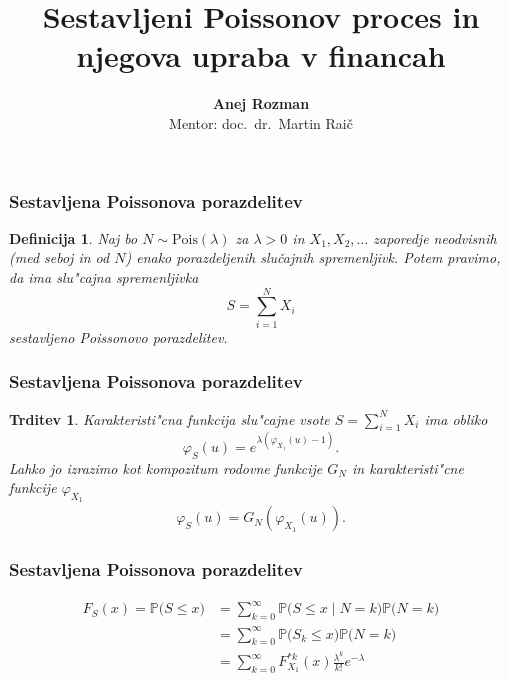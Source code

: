 \documentclass[handout]{beamer} %
\title[CPP in njegova uporaba v financah]{Sestavljeni Poissonov proces in njegova upraba v financah}
\subtitle{}
\author[Anej Rozman]{\textbf{Anej Rozman} \\ \footnotesize Mentor: doc.~dr.~Martin Raič}
\institute[UL-FMF]{Univerza v Ljubljani, Fakulteta za matematiko in fiziko}
\date[]{}
\theoremstyle{plain}
\newtheorem{definicija}{Definicija}
\newtheorem{trditev}{Trditev}
\newcommand{\Prob}{\mathbb{P}}
\newcommand{\Pois}[1]{\text{Pois}(#1)}
\begin{document}
\frame{\titlepage}


\begin{frame}
  \frametitle{Sestavljena Poissonova porazdelitev}
  \begin{definicija}
    Naj bo $N\sim \Pois{\lambda}$  za $\lambda >0$ in $X_1, X_2, \dots$ zaporedje neodvisnih (med seboj in od $N$)
    enako porazdeljenih slučajnih spremenljivk. Potem pravimo, da ima slu"cajna spremenljivka
    \begin{equation*}
        S = \sum_{i=1}^NX_i
    \end{equation*}
    \textit{sestavljeno Poissonovo porazdelitev}. 
    \label{def:sestavljenaPoissonovaPorazdelitev}
  \end{definicija}
\end{frame}

\begin{frame}
  \frametitle{Sestavljena Poissonova porazdelitev}
  \begin{trditev}
    Karakteristi"cna funkcija slu"cajne vsote $S=\sum_{i = 1}^{N}X_i$ ima obliko 
    \begin{equation*}
        \varphi_{S}(u) = e^{\lambda \left(\varphi_{X_1}(u) - 1\right)}.
    \end{equation*}
    Lahko jo izrazimo kot kompozitum rodovne funkcije $G_N$ in karakteristi"cne funkcije $\varphi_{X_1}$
    \begin{align*}
      \varphi_{S}(u) = G_{N}\left(\varphi_{X_1}(u)\right).
  \end{align*}
    \label{pos:RodovnaKarakteristicna}
  \end{trditev}
\end{frame}
 
\begin{frame}
  \frametitle{Sestavljena Poissonova porazdelitev}
  \begin{align*}
    F_{S}(x) = \Prob\bigl(S \leq x\bigr) 
    &= \sum_{k=0}^\infty \Prob\bigl(S \leq x \mid N = k\bigr)\Prob\bigl(N = k\bigr) \\
    &= \sum_{k=0}^\infty \Prob\bigl(S_k \leq x\bigr)\Prob\bigl(N = k\bigr) \\
    &= \sum_{k=0}^\infty F_{X_1}^{*k}(x) \frac{\lambda^k}{k!} e^{-\lambda}
  \end{align*}
\end{frame}
\end{document}
